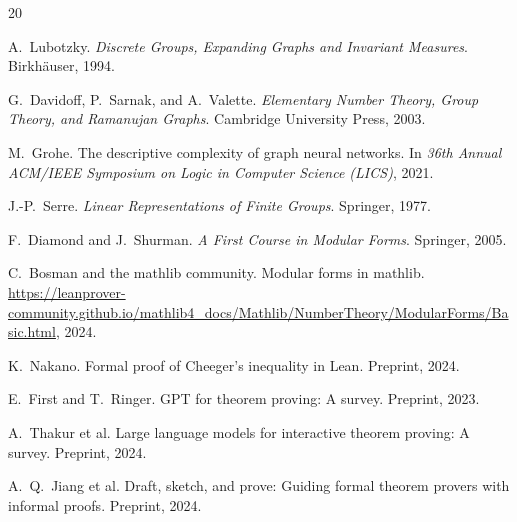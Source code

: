 \documentclass[11pt]{article}
\theoremstyle{plain}
\theoremstyle{definition}
\theoremstyle{remark}
\begin{document}
\begin{thebibliography}{20}

A.~Lubotzky.
\emph{Discrete Groups, Expanding Graphs and Invariant Measures}.
Birkhäuser, 1994.

G.~Davidoff, P.~Sarnak, and A.~Valette.
\emph{Elementary Number Theory, Group Theory, and Ramanujan Graphs}.
Cambridge University Press, 2003.

M.~Grohe.
The descriptive complexity of graph neural networks.
In \emph{36th Annual ACM/IEEE Symposium on Logic in Computer Science (LICS)}, 2021.

J.-P.~Serre.
\emph{Linear Representations of Finite Groups}.
Springer, 1977.

F.~Diamond and J.~Shurman.
\emph{A First Course in Modular Forms}.
Springer, 2005.

C.~Bosman and the mathlib community.
Modular forms in mathlib.
\url{https://leanprover-community.github.io/mathlib4_docs/Mathlib/NumberTheory/ModularForms/Basic.html}, 2024.

K.~Nakano.
Formal proof of Cheeger's inequality in Lean.
Preprint, 2024.

E.~First and T.~Ringer.
GPT for theorem proving: A survey.
Preprint, 2023.

A.~Thakur et al.
Large language models for interactive theorem proving: A survey.
Preprint, 2024.

A.~Q.~Jiang et al.
Draft, sketch, and prove: Guiding formal theorem provers with informal proofs.
Preprint, 2024.

\end{thebibliography}
\end{document}
